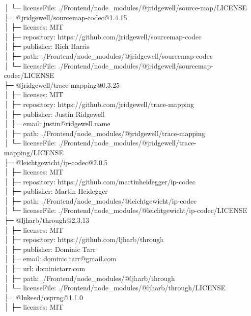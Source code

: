 │  └─ licenseFile: ./Frontend/node\_modules/@jridgewell/source-map/LICENSE\\
├─ @jridgewell/sourcemap-codec@1.4.15\\
│  ├─ licenses: MIT\\
│  ├─ repository: https://github.com/jridgewell/sourcemap-codec\\
│  ├─ publisher: Rich Harris\\
│  ├─ path: ./Frontend/node\_modules/@jridgewell/sourcemap-codec\\
│  └─ licenseFile: ./Frontend/node\_modules/@jridgewell/sourcemap-codec/LICENSE\\
├─ @jridgewell/trace-mapping@0.3.25\\
│  ├─ licenses: MIT\\
│  ├─ repository: https://github.com/jridgewell/trace-mapping\\
│  ├─ publisher: Justin Ridgewell\\
│  ├─ email: justin@ridgewell.name\\
│  ├─ path: ./Frontend/node\_modules/@jridgewell/trace-mapping\\
│  └─ licenseFile: ./Frontend/node\_modules/@jridgewell/trace-mapping/LICENSE\\
├─ @leichtgewicht/ip-codec@2.0.5\\
│  ├─ licenses: MIT\\
│  ├─ repository: https://github.com/martinheidegger/ip-codec\\
│  ├─ publisher: Martin Heidegger\\
│  ├─ path: ./Frontend/node\_modules/@leichtgewicht/ip-codec\\
│  └─ licenseFile: ./Frontend/node\_modules/@leichtgewicht/ip-codec/LICENSE\\
├─ @ljharb/through@2.3.13\\
│  ├─ licenses: MIT\\
│  ├─ repository: https://github.com/ljharb/through\\
│  ├─ publisher: Dominic Tarr\\
│  ├─ email: dominic.tarr@gmail.com\\
│  ├─ url: dominictarr.com\\
│  ├─ path: ./Frontend/node\_modules/@ljharb/through\\
│  └─ licenseFile: ./Frontend/node\_modules/@ljharb/through/LICENSE\\
├─ @lukeed/csprng@1.1.0\\
│  ├─ licenses: MIT\\
